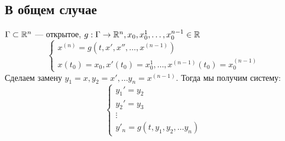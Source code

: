 \subsection{В общем случае}
\(\Gamma \subset \mathbb{R}^n\) --- открытое, \(g: \Gamma \rightarrow \mathbb{R}^n, x_0, x_0^1, \dots, x_0^{n - 1} \in \mathbb{R}\)
\begin{equation}
    \begin{cases}
        x^{(n)} = g(t, x', x'', \dots, x^{(n - 1)}) \\
        x(t_0) = x_0, x'(t_0) = x_0^1, \dots, x^{(n - 1)}(t_0) = x_0^{(n - 1)}
    \end{cases}
\end{equation}
Сделаем замену \(y_1 = x, y_2 = x', \dots y_n = x^{(n - 1)}\). Тогда мы получим систему:
\begin{equation}
    \begin{cases}
        y_1' = y_2 \\
        y_2' = y_3 \\
        \vdots \\
        y'_n = g(t, y_1, y_2, \dots y_n)
    \end{cases}
\end{equation}

